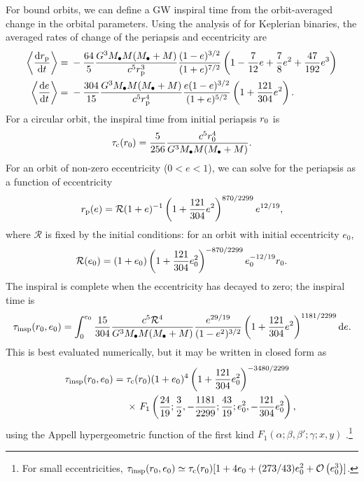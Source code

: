 For bound orbits, we can define a GW inspiral time from the orbit-averaged change in the orbital parameters. Using the analysis of \citet{Peters1964} for Keplerian binaries, the averaged rates of change of the periapsis and eccentricity are
\begin{align}
\left\langle\dfrac{\mathrm{d} {r_\mathrm{p}}}{\mathrm{d} {t}}\right\rangle = {} & -\dfrac{64}{5}\dfrac{G^3M_\bullet M(M_\bullet + M)}{c^5r_\mathrm{p}^3}\dfrac{(1 - e)^{3/2}}{(1 + e)^{7/2}}\left(1 - \dfrac{7}{12}e + \dfrac{7}{8}e^2 + \dfrac{47}{192}e^3\right) \\
\left\langle\dfrac{\mathrm{d} {e}}{\mathrm{d} {t}}\right\rangle = {} & -\dfrac{304}{15}\dfrac{G^3M_\bullet M(M_\bullet + M)}{c^5r_\mathrm{p}^4}\dfrac{e(1 - e)^{3/2}}{(1 + e)^{5/2}}\left(1 + \dfrac{121}{304}e^2\right).
\end{align}
For a circular orbit, the inspiral time from initial periapsis $r_\mathrm{0}$ is
\begin{equation}
\tau_\mathrm{c}(r_\mathrm{0}) = \dfrac{5}{256}\dfrac{c^5r_\mathrm{0}^4}{G^3M_\bullet M(M_\bullet + M)}.
\end{equation}
For an orbit of non-zero eccentricity ($0 < e < 1$), we can solve for the periapsis as a function of eccentricity
\begin{equation}
r_\mathrm{p}(e) = \mathcal{R}(1 + e)^{-1}\left(1 + \dfrac{121}{304}e^2\right)^{870/2299}e^{12/19},
\end{equation}
where $\mathcal{R}$ is fixed by the initial conditions: for an orbit with initial eccentricity $e_0$,
\begin{equation}
\mathcal{R}(e_0) = (1 + e_0)\left(1 + \dfrac{121}{304}e_0^2\right)^{-870/2299}e_0^{-12/19}r_\mathrm{0}.
\end{equation}
The inspiral is complete when the eccentricity has decayed to zero; the inspiral time is \citep{Peters1964}
\begin{equation}
\tau_\mathrm{insp}(r_\mathrm{0},e_0) = \int_{0}^{e_0}{\dfrac{15}{304}\dfrac{c^5\mathcal{R}^4}{G^3M_\bullet M(M_\bullet + M)}\dfrac{e^{29/19}}{(1-e^2)^{3/2}}\left(1 + \dfrac{121}{304}e^2\right)^{1181/2299}}\,\mathrm{d}{e}.
\end{equation}
This is best evaluated numerically, but it may be written in closed form as
\begin{align}
\tau_\mathrm{insp}(r_\mathrm{0},e_0) = {} & \tau_\mathrm{c}(r_\mathrm{0})(1 + e_0)^4\left(1 + \dfrac{121}{304}e_0^2\right)^{-3480/2299} \nonumber \\* 
 {} & \times \left. F_1\left(\dfrac{24}{19};\dfrac{3}{2},-\dfrac{1181}{2299};\dfrac{43}{19};e_0^2,-\dfrac{121}{304}e_0^2\right),\right.
\label{eq:Bound_inspiral}
\end{align}
using the Appell hypergeometric function of the first kind $F_1(\alpha;\beta,\beta';\gamma;x,y)$ \citep[16.15.1]{Olver2010}.\footnote{For small eccentricities, $\tau_\mathrm{insp}(r_\mathrm{0},e_0) \simeq \tau_\mathrm{c}(r_\mathrm{0})[1 + 4e_0 + (273/43)e_0^2 + \mathcal{O}\left({e_0^3}\right)]$.}

